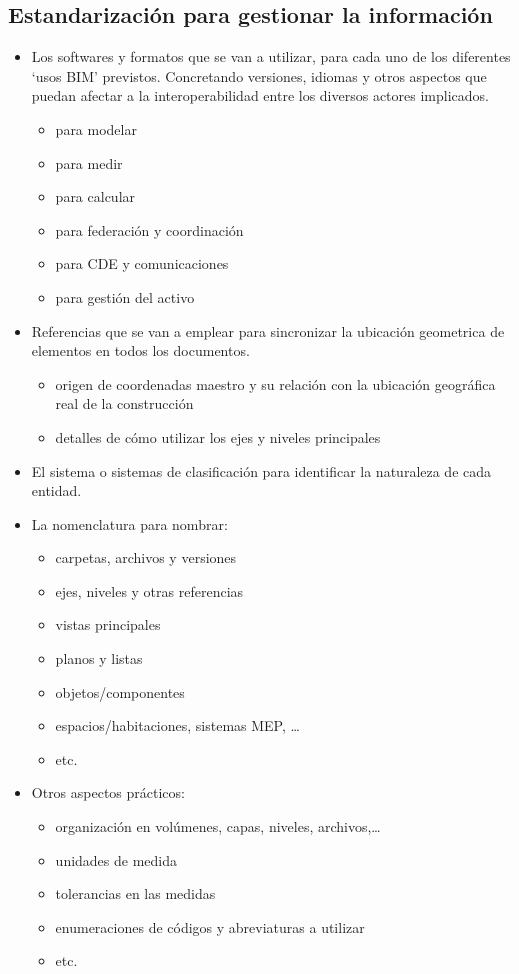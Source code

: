 \documentclass[spanish,12pt,a4paper,final,oneside]{book}
\begin{document}
\subsection{Estandarización para gestionar la información}
\begin{itemize}

\item Los softwares y formatos que se van a utilizar, para cada uno de los diferentes `usos BIM' previstos. Concretando versiones, idiomas y otros aspectos que puedan afectar a la interoperabilidad entre los diversos actores implicados.
\begin{itemize}
\item para modelar
\item para medir
\item para calcular
\item para federación y coordinación
\item para CDE y comunicaciones
\item para gestión del activo
\end{itemize}

\item Referencias que se van a emplear para sincronizar la ubicación geometrica de elementos en todos los documentos.
\begin{itemize}
\item origen de coordenadas maestro y su relación con la ubicación geográfica real de la construcción
\item detalles de cómo utilizar los ejes y niveles principales
\end{itemize}

\item El sistema o sistemas de clasificación para identificar la naturaleza de cada entidad.

\item La nomenclatura para nombrar:
\begin{itemize}
\item carpetas, archivos y versiones
\item ejes, niveles y otras referencias
\item vistas principales
\item planos y listas
\item objetos/componentes
\item espacios/habitaciones, sistemas MEP, \ldots
\item etc.
\end{itemize}

\item Otros aspectos prácticos:
\begin{itemize}
\item organización en volúmenes, capas, niveles, archivos,\ldots
\item unidades de medida
\item tolerancias en las medidas
\item enumeraciones de códigos y abreviaturas a utilizar
\item etc.
\end{itemize}

\end{itemize}
\end{document}
